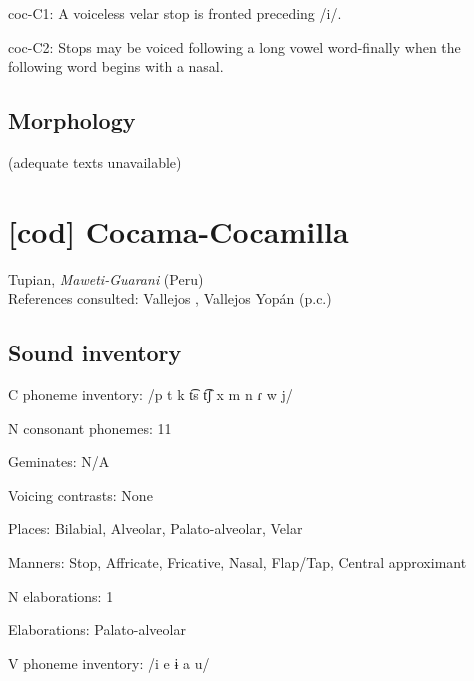 {\begin{appendixdesc}
\item[coc-C1:] A voiceless velar stop is fronted preceding /i/. \citep[15]{Crawford1966}

\item[coc-C2:] Stops may be voiced following a long vowel word-finally when the following word begins with a nasal. \citep[99--100]{Bendixen1980}
\end{appendixdesc}
\subsection*{Morphology}

(adequate texts unavailable)

\section*{[cod] Cocama-Cocamilla}  %
Tupian, \textit{Maweti-Guarani} (Peru)\medskip\\
References consulted: Vallejos \citet{Yopán2010}, Vallejos Yopán (p.c.)

\subsection*{Sound inventory}
\begin{appendixdesc}

\item[C phoneme inventory:] /p t k t͡s t͡ʃ x m n ɾ w j/

\item[N consonant phonemes:] 11

\item[Geminates:] N/A

\item[Voicing contrasts:] None

\item[Places:] Bilabial, Alveolar, Palato-alveolar, Velar

\item[Manners:] Stop, Affricate, Fricative, Nasal, Flap/Tap, Central approximant

\item[N elaborations:] 1

\item[Elaborations:] Palato-alveolar

\item[V phoneme inventory:] /i e ɨ a u/


\end{appendixdesc}}
